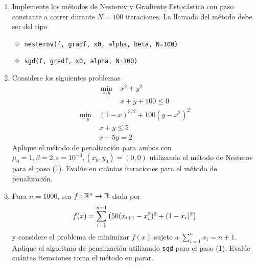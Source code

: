 \documentclass{article}
\begin{document}
\begin{enumerate}
	\item Implemente los métodos de Nesterov y Gradiente Estocástico con paso constante a correr durante \(N=100\) iteraciones. La llamada del método debe ser del tipo
	\begin{itemize}
		\item \texttt{nesterov(f, gradf, x0, alpha, beta, N=100)}
		\item \texttt{sgd(f, gradf, x0, alpha, N=100)}
	\end{itemize}
	\item Considere los siguientes problemas
	\begin{align*}
		\min_{x,y}\; &x^2 + y^2 \\
		& x + y + 100 \leq 0
	\end{align*}
	\begin{align*}
		\min_{x,y}\; &(1 - x)^{3/2} + 100(y - x^2)^2 \\
		& x+y \leq 5 \\
		& x - 5y = 2
	\end{align*}
	Aplique el método de penalización para ambos con \(\mu_0 = 1, \beta = 2, \epsilon = 10^{-3}, (x_0, y_0) = (0, 0)\) utilizando el método de Nesterov para el paso (1). Evalúe en cuántas iteraciones para el método de penalización.
	\item Para \(n = 1000\), sea \(f: \mathbb{R}^n \to \mathbb{R}\) dada por
	\[f(x) = \sum_{i=1}^{n-1} \qty(50(x_{i+1} - x_i^2)^2 + (1 - x_i)^2)\]
	y considere el problema de minimizar \(f(x)\) sujeto a \(\sum_{i=1}^n x_i = n+1\). Aplique el algoritmo de penalización utilizando \texttt{sgd} para el paso (1). Evalúe cuántas iteraciones toma el método en parar.
\end{enumerate}
\end{document}
